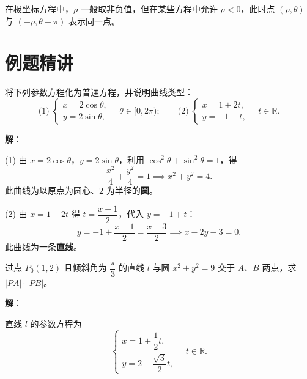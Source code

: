 \documentclass[12pt,a4paper]{ctexart}
\theoremstyle{definition}
\begin{document}
\begin{note}
  在极坐标方程中，$\rho$ 一般取非负值，但在某些方程中允许 $\rho<0$，此时点 $(\rho,\theta)$ 与 $(-\rho,\theta+\pi)$ 表示同一点。
\end{note}

\newpage

\section{例题精讲}

\begin{example}
  将下列参数方程化为普通方程，并说明曲线类型：
  \[
    \text{(1)}\;\begin{cases} x = 2\cos\theta, \\ y = 2\sin\theta, \end{cases}\quad \theta\in[0,2\pi);
    \qquad
    \text{(2)}\;\begin{cases} x = 1 + 2t, \\ y = -1 + t, \end{cases}\quad t\in\mathbb{R}.
  \]
\end{example}

\textbf{解}：

(1) 由 $x=2\cos\theta$，$y=2\sin\theta$，利用 $\cos^2\theta+\sin^2\theta=1$，得
\[
  \frac{x^2}{4} + \frac{y^2}{4} = 1 \implies x^2 + y^2 = 4.
\]
此曲线为以原点为圆心、$2$ 为半径的\textbf{圆}。

(2) 由 $x=1+2t$ 得 $t = \dfrac{x-1}{2}$，代入 $y=-1+t$：
\[
  y = -1 + \frac{x-1}{2} = \frac{x-3}{2} \implies x - 2y - 3 = 0.
\]
此曲线为一条\textbf{直线}。

\begin{example}
  过点 $P_0(1,2)$ 且倾斜角为 $\dfrac{\pi}{3}$ 的直线 $l$ 与圆 $x^2+y^2=9$ 交于 $A$、$B$ 两点，求 $|PA|\cdot|PB|$。
\end{example}

\textbf{解}：

直线 $l$ 的参数方程为
\[
  \begin{cases}
    x = 1 + \dfrac{1}{2}t, \\[6pt]
    y = 2 + \dfrac{\sqrt{3}}{2}t,
  \end{cases}
  \quad t \in \mathbb{R}.
\]
\end{document}
